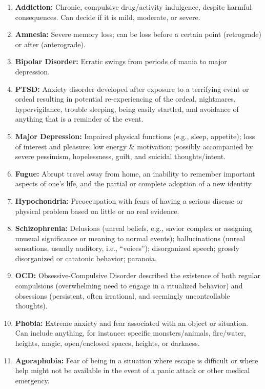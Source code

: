 \begin{enumerate}
    \item \textbf{Addiction:} Chronic, compulsive drug/activity indulgence, despite harmful consequences. Can decide if it is mild, moderate, or severe.
    \item \textbf{Amnesia:} Severe memory loss; can be loss before a certain point (retrograde) or after (anterograde).
    \item \textbf{Bipolar Disorder:} Erratic swings from periods of mania to major depression.
    \item \textbf{PTSD:} Anxiety disorder developed after exposure to a terrifying event or ordeal resulting in potential re-experiencing of the ordeal, nightmares, hypervigilance, trouble sleeping, being easily startled, and avoidance of anything that is a reminder of the event.
    \item \textbf{Major Depression:} Impaired physical functions (e.g., sleep, appetite); loss of interest and pleasure; low energy \& motivation; possibly accompanied by severe pessimism, hopelessness, guilt, and suicidal thoughts/intent.
    \item \textbf{Fugue:} Abrupt travel away from home, an inability to remember important aspects of one’s life, and the partial or complete adoption of a new identity.
    \item \textbf{Hypochondria:} Preoccupation with fears of having a serious disease or physical problem based on little or no real evidence.
    \item \textbf{Schizophrenia:} Delusions (unreal beliefs, e.g., savior complex or assigning unusual significance or meaning to normal events); hallucinations (unreal sensations, usually auditory, i.e., “voices”); disorganized speech; grossly disorganized or catatonic behavior; paranoia.
    \item \textbf{OCD:} Obsessive-Compulsive Disorder described the existence of both regular compulsions (overwhelming need to engage in a ritualized behavior) and obsessions (persistent, often irrational, and seemingly uncontrollable thoughts).
    \item \textbf{Phobia:} Extreme anxiety and fear associated with an object or situation. Can include anything, for instance: specific monsters/animals, fire/water, heights, magic, open/enclosed spaces, heights, or darkness.
    \item \textbf{Agoraphobia:} Fear of being in a situation where escape is difficult or where help might not be available in the event of a panic attack or other medical emergency.

\end{enumerate}

